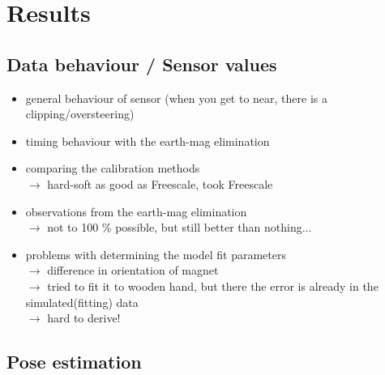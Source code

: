 \lhead[\chaptername~\thechapter]{\rightmark}

\rhead[\leftmark]{}

\lfoot[\thepage]{}

\cfoot{}

\rfoot[]{\thepage}

\chapter{Results} \label{cha:results}

\section{Data behaviour / Sensor values} \label{sec:dataRes}

\begin{itemize}
\item general behaviour of sensor (when you get to near, there is a clipping/oversteering)
\item timing behaviour with the earth-mag elimination

\item comparing the calibration methods \\
		$ \rightarrow $ hard-soft as good as Freescale, took Freescale
		
\item observations from the earth-mag elimination \\
		$ \rightarrow $ not to 100 \%  possible, but still better than nothing...
		
\item problems with determining the model fit parameters \\
		$ \rightarrow $ difference in orientation of magnet \\
		$ \rightarrow $ tried to fit it to wooden hand, but there the error is already in the simulated(fitting) data \\
		$ \rightarrow $ hard to derive!
		
\end{itemize}


\section{Pose estimation} \label{sec:estimationRes}

